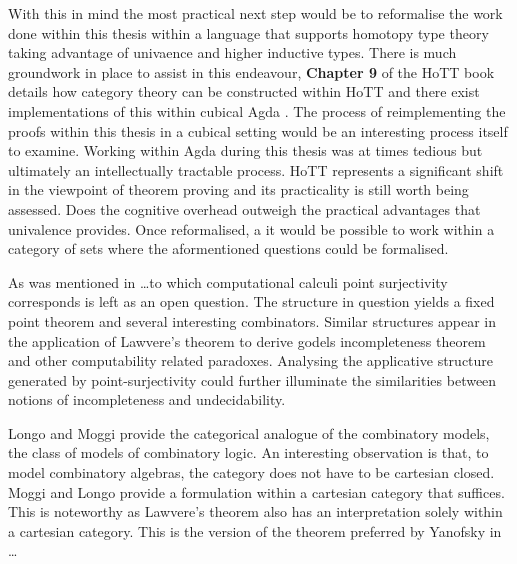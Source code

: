

With this in mind the most practical next step would be to reformalise the work
done within this thesis within a language that supports homotopy type theory
taking advantage of univaence and higher inductive types. There is much
groundwork in place to assist in this endeavour, \textbf{Chapter 9} of
the HoTT book details how category theory can be constructed within HoTT and
there exist implementations of this within cubical Agda . The
process of reimplementing the proofs within this thesis in a cubical setting
would be an interesting process itself to examine. Working within Agda during
this thesis was at times tedious but ultimately an intellectually tractable
process. HoTT represents a significant shift in the viewpoint of theorem proving
and its practicality is still worth being assessed. Does the cognitive overhead
outweigh the practical advantages that univalence provides. Once reformalised, a
it would be possible to work within a category of sets where the aformentioned
questions could be formalised.


As was mentioned in \ldots to which computational calculi point surjectivity
corresponds is left as an open question. The structure in question yields a
fixed point theorem and several interesting combinators. Similar structures
appear in the application of Lawvere's theorem to derive godels incompleteness
theorem and other computability related paradoxes. Analysing the applicative
structure generated by point-surjectivity could further illuminate the
similarities between notions of incompleteness and undecidability.


Longo and Moggi provide the categorical analogue of the combinatory models, the
class of models of combinatory logic. An interesting observation is that, to
model combinatory algebras, the category does not have to be cartesian closed.
Moggi and Longo provide a formulation within a cartesian category that suffices.
This is noteworthy as Lawvere's theorem also has an interpretation solely within
a cartesian category. This is the version of the theorem preferred by Yanofsky
in \ldots
